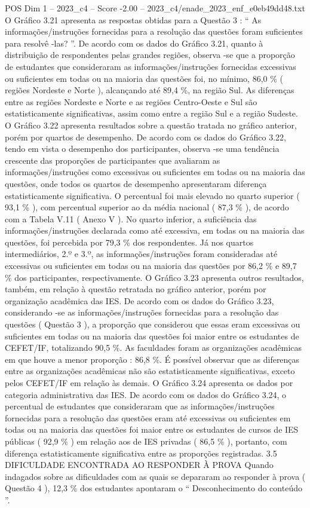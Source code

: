 \begin{textsample}{POS Dim 1 – 2023\_c4 – Score -2.00 – 2023\_c4/enade\_2023\_enf\_e0eb49dd48.txt}
O Gráfico 3.21 apresenta as respostas obtidas para a Questão 3 : “ As informações/instruções fornecidas para a resolução das questões foram suficientes para resolvê -las? ”.
De acordo com os dados do Gráfico 3.21, quanto à distribuição de respondentes pelas grandes regiões, observa -se que a proporção de estudantes que consideraram as informações/instruções fornecidas excessivas ou suficientes em todas ou na maioria das questões foi, no mínimo, 86,0 \% ( regiões Nordeste e Norte ), alcançando até 89,4 \%, na região Sul.
As diferenças entre as regiões Nordeste e Norte e as regiões Centro-Oeste e Sul são estatisticamente significativas, assim como entre a região Sul e a região Sudeste.
O Gráfico 3.22 apresenta resultados sobre a questão tratada no gráfico anterior, porém por quartos de desempenho.
De acordo com os dados do Gráfico 3.22, tendo em vista o desempenho dos participantes, observa -se uma tendência crescente das proporções de participantes que avaliaram as informações/instruções como excessivas ou suficientes em todas ou na maioria das questões, onde todos os quartos de desempenho apresentaram diferença estatisticamente significativa.
O percentual foi mais elevado no quarto superior ( 93,1 \% ), com percentual superior ao da média nacional ( 87,3 \% ), de acordo com a Tabela V.11 ( Anexo V ).
No quarto inferior, a suficiência das informações/instruções declarada como até excessiva, em todas ou na maioria das questões, foi percebida por 79,3 \% dos respondentes.
Já nos quartos intermediários, 2.º e 3.º, as informações/instruções foram consideradas até excessivas ou suficientes em todas ou na maioria das questões por 86,2 \% e 89,7 \% dos participantes, respectivamente.
O Gráfico 3.23 apresenta outros resultados, também, em relação à questão retratada no gráfico anterior, porém por organização acadêmica das IES.
De acordo com os dados do Gráfico 3.23, considerando -se as informações/instruções fornecidas para a resolução das questões ( Questão 3 ), a proporção que considerou que essas eram excessivas ou suficientes em todas ou na maioria das questões foi maior entre os estudantes de CEFET/IF, totalizando 90,5 \%.
As faculdades foram as organizações acadêmicas em que houve a menor proporção : 86,8 \%.
É possível observar que as diferenças entre as organizações acadêmicas não são estatisticamente significativas, exceto pelos CEFET/IF em relação às demais.
O Gráfico 3.24 apresenta os dados por categoria administrativa das IES.
De acordo com os dados do Gráfico 3.24, o percentual de estudantes que consideraram que as informações/instruções fornecidas para a resolução das questões eram até excessivas ou suficientes em todas ou na maioria das questões foi maior entre os estudantes de cursos de IES públicas ( 92,9 \% ) em relação aos de IES privadas ( 86,5 \% ), portanto, com diferença estatisticamente significativa entre as proporções registradas. 3.5 DIFICULDADE ENCONTRADA AO RESPONDER À PROVA Quando indagados sobre as dificuldades com as quais se depararam ao responder à prova ( Questão 4 ), 12,3 \% dos estudantes apontaram o “ Desconhecimento do conteúdo ”.

\end{textsample}
